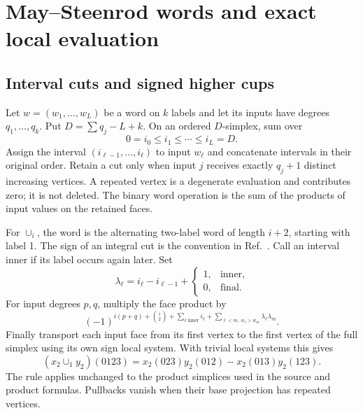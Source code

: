 \section{May--Steenrod words and exact local evaluation}\label{app:operations}\label{app:ops}
\subsection{Interval cuts and signed higher cups}
Let $w=(w_1,\ldots,w_L)$ be a word on $k$ labels and let its inputs have degrees $q_1,\ldots,q_k$. Put $D=\sum q_j-L+k$. On an ordered $D$-simplex, sum over
\begin{equation}
0=i_0\le i_1\le\cdots\le i_L=D.
\end{equation}
Assign the interval $(i_{\ell-1},\ldots,i_\ell)$ to input $w_\ell$ and concatenate intervals in their original order. Retain a cut only when input $j$ receives exactly $q_j+1$ distinct increasing vertices. A repeated vertex is a degenerate evaluation and contributes zero; it is not deleted. The binary word operation is the sum of the products of input values on the retained faces.

For $\cup_i$, the word is the alternating two-label word of length $i+2$, starting with label 1. The sign of an integral cut is the convention in Ref.~\cite{Project4}. Call an interval inner if its label occurs again later. Set
\begin{equation}
\lambda_\ell=i_\ell-i_{\ell-1}+\begin{cases}1,&\text{inner},\\0,&\text{final}.
\end{cases}
\end{equation}
For input degrees $p,q$, multiply the face product by
\begin{equation}
(-1)^{i(p+q)+\binom i2+
\sum_{\ell\text{ inner}}i_\ell+
\sum_{\ell<m,\ w_\ell>w_m}\lambda_\ell\lambda_m}.
\end{equation}
Finally transport each input face from its first vertex to the first vertex of the full simplex using its own sign local system. With trivial local systems this gives
\begin{equation}
(x_2\cup_1y_2)(0123)=x_2(023)y_2(012)-x_2(013)y_2(123).
\end{equation}
The rule applies unchanged to the product simplices used in the source and product formulas. Pullbacks vanish when their base projection has repeated vertices.


